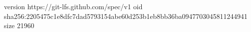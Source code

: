 version https://git-lfs.github.com/spec/v1
oid sha256:2205475c1e8dfc7dad5793154abe60d253b1eb8bb36ba0947703045811244941
size 21960
